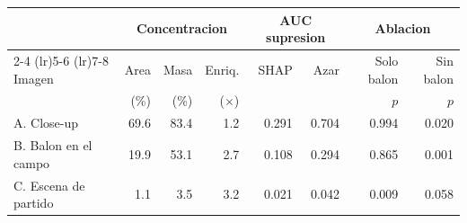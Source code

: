 \begin{tabular}{lrrrrrrr}
\toprule
& \multicolumn{3}{c}{Concentracion} & \multicolumn{2}{c}{AUC supresion} & \multicolumn{2}{c}{Ablacion} \\
\cmidrule(lr){2-4} \cmidrule(lr){5-6} \cmidrule(lr){7-8}
Imagen & Area & Masa & Enriq. & SHAP & Azar & Solo balon & Sin balon \\
& (\%) & (\%) & ($\times$) & & & $p$ & $p$ \\
\midrule
A. Close-up & 69.6 & 83.4 & 1.2 & 0.291 & 0.704 & 0.994 & 0.020 \\
B. Balon en el campo & 19.9 & 53.1 & 2.7 & 0.108 & 0.294 & 0.865 & 0.001 \\
C. Escena de partido & 1.1 & 3.5 & 3.2 & 0.021 & 0.042 & 0.009 & 0.058 \\
\bottomrule
\end{tabular}
